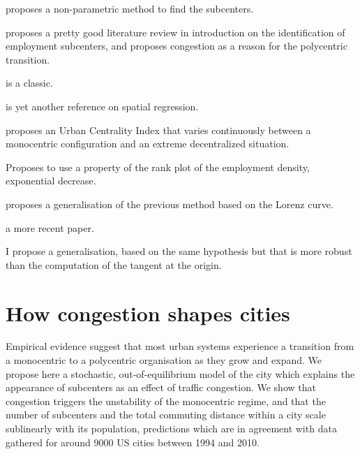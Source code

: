 \cite{McMillen:2001} proposes a non-parametric method to find the subcenters.

\cite{McMillen:2003} proposes a pretty good literature review in introduction on
the identification of employment subcenters, and proposes congestion as a reason
for the polycentric transition.

\cite{Tsai:2005} is a classic.

\cite{Griffith:2007} is yet another reference on spatial regression.

\cite{Pereira:2013} proposes an Urban Centrality Index that varies continuously
between a monocentric configuration and an extreme decentralized situation.

\cite{Louf:2013_polycentric} Proposes to use a property of the rank plot of the
employment density, exponential decrease.

\cite{Louail:2014} proposes a generalisation of the previous method based on the
Lorenz curve.

\cite{LeNechet:2015} a more recent paper.

I propose a generalisation, based on the same hypothesis but that is more robust
than the computation of the tangent at the origin.

\section{How congestion shapes cities}
\label{sec:how_congestion_shapes_cities}

Empirical evidence suggest that most urban systems experience a
transition from a monocentric to a polycentric organisation as they
grow and expand. We propose here a stochastic, out-of-equilibrium model of the
city which explains the appearance of subcenters as an effect of
traffic congestion. We show that congestion triggers the unstability
of the monocentric regime, and that the number of subcenters and the
total commuting distance within a city scale sublinearly with its
population, predictions which are in agreement with data gathered for
around 9000 US cities between 1994 and 2010.\\


